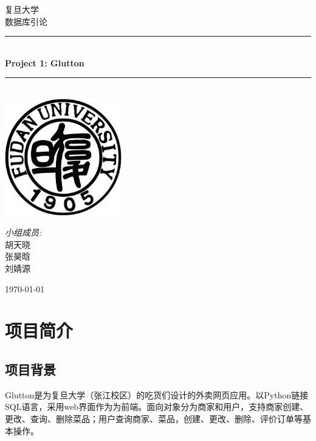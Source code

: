 \documentclass[12pt, oneside,a4paper]{article}
\newcommand{\HRule}{\rule{\linewidth}{0.5mm}}
\begin{document}
\begin{titlepage}
\begin{center}
\textsc{\LARGE 复旦大学}\\[1.5cm]
\textsc{\Large 数据库引论}\\[0.5cm]
\HRule \\[1.0cm]
{ \huge \bfseries Project 1: Glutton}\\[0.4cm]
\HRule \\[1.5cm]
\includegraphics[width=2in]{logo.jpg}\\[1cm]
\begin{minipage}{0.4\textwidth}
\begin{flushleft} \large
\begin{center}
\emph{小组成员:}\\
胡天晓\\
张昊晗\\
刘婧源
\end{center}
\end{flushleft}
\end{minipage}
\vfill
{\large \today}
\end{center}
\end{titlepage}

\section{项目简介}
\subsection{项目背景}
Glutton是为复旦大学（张江校区）的吃货们设计的外卖网页应用。以Python链接SQL语言，采用web界面作为为前端。面向对象分为商家和用户，支持商家创建、更改、查询、删除菜品；用户查询商家、菜品，创建、更改、删除、评价订单等基本操作。
\end{document}
